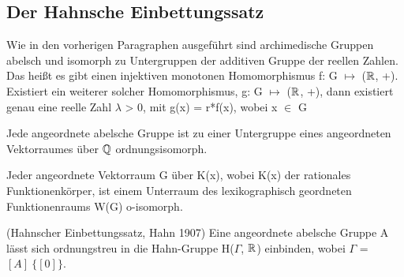 \subsection{Der Hahnsche Einbettungssatz}
%
Wie in den vorherigen Paragraphen ausgeführt sind archimedische Gruppen abelsch und isomorph zu Untergruppen der additiven Gruppe der reellen Zahlen. Das heißt es gibt einen injektiven monotonen Homomorphismus f: G $\mapsto$ ($\mathbb{R} $, +). Existiert ein weiterer solcher Homomorphismus, g: G $\mapsto$ ($\mathbb{R}$, +), dann existiert genau eine reelle Zahl $\lambda$ > 0, mit g(x) = r*f(x), wobei x $\in$ G
%
\begin{satz}
Jede angeordnete abelsche Gruppe ist zu einer Untergruppe eines angeordneten Vektorraumes über $\mathbb{Q}$ ordnungsisomorph. 
\end{satz}
%
\begin{satz} 
Jeder angeordnete Vektorraum G über K(x), wobei K(x) der rationales Funktionenkörper, ist einem Unterraum des lexikographisch geordneten Funktionenraums W(G) o-isomorph. 
\end{satz}


\begin{satz} \label{hebs} \cite{priesscrampe83}
 (Hahnscher Einbettungssatz, Hahn 1907)
Eine angeordnete abelsche Gruppe A lässt sich ordnungstreu in die Hahn-Gruppe H($ \Gamma $, $ \mathbb{R} $) einbinden, wobei $ \Gamma$ =$ [A]\ \{[0]\} $.
\end{satz}
%
